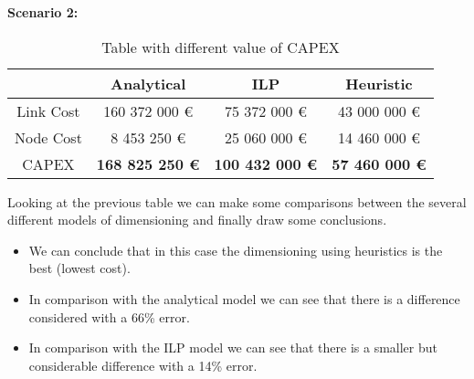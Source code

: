 \vspace{11pt}
\textbf{Scenario 2:}\\

\begin{table}[h!]
\centering
\begin{tabular}{| c | c | c | c |}
 \hline
   & Analytical & ILP & Heuristic \\
 \hline\hline
 Link Cost & 160 372 000 \euro & 75 372 000 \euro & 43 000 000 \euro \\
 Node Cost & 8 453 250 \euro & 25 060 000 \euro & 14 460 000 \euro \\
 CAPEX & \textbf{168 825 250 \euro} & \textbf{100 432 000 \euro} & \textbf{57 460 000 \euro} \\
 \hline
\end{tabular}
\caption{Table with different value of CAPEX }
\label{table_comparative_opaque_sur_ref_2}
\end{table}

\vspace{11pt}
Looking at the previous table we can make some comparisons between the several different models of dimensioning and finally draw some conclusions.

\begin{itemize}
  \item We can conclude that in this case the dimensioning using heuristics is the best (lowest cost).
  \item In comparison with the analytical model we can see that there is a difference considered with a 66\% error.
  \item In comparison with the ILP model we can see that there is a smaller but considerable difference with a 14\% error.
\end{itemize}

